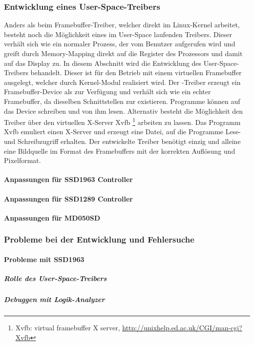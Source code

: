 \subsubsection{Entwicklung eines User-Space-Treibers}
Anders als beim Framebuffer-Treiber, welcher direkt im Linux-Kernel arbeitet, besteht noch die Möglichkeit eines im User-Space laufenden Treibers. Dieser verhält sich wie ein normaler Prozess, der vom Benutzer aufgerufen wird und greift durch Memory-Mapping direkt auf die Register des Prozessors und damit auf das Display zu.
In diesem Abschnitt wird die Entwicklung des User-Space-Treibers behandelt. 
Dieser ist für den Betrieb mit einem virtuellen Framebuffer ausgelegt, welcher durch Kernel-Modul  realisiert wird. Der -Treiber erzeugt ein Framebuffer-Device als  zur Verfügung und verhält sich wie ein echter Framebuffer, da dieselben Schnittstellen zur existieren. Programme können auf das Device schreiben und von ihm lesen. Alternativ besteht die Möglichkeit den Treiber über den virtuellen X-Server Xvfb \footnote{Xvfb: virtual framebuffer X server, \url{http://unixhelp.ed.ac.uk/CGI/man-cgi?Xvfb}} arbeiten zu lassen. Das Programm Xvfb emuliert einen X-Server und erzeugt eine Datei, auf die Programme Lese- und Schreibzugriff erhalten. Der entwickelte Treiber benötigt einzig und alleine eine Bildquelle im Format des Framebuffers mit der korrekten Auflösung und Pixelformat. 


\paragraph{Anpassungen für SSD1963 Controller}
\paragraph{Anpassungen für SSD1289 Controller}
\paragraph{Anpassungen für MD050SD}
\subsubsection{Probleme bei der Entwicklung und Fehlersuche}
\paragraph{Probleme mit SSD1963}
\subparagraph{Rolle des User-Space-Treibers}
\subparagraph{Debuggen mit Logik-Analyzer}




